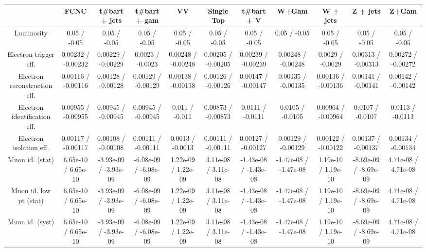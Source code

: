 \begin{table}[htbp]
\begin{center}
\footnotesize
\begin{tabular}{|c|c|c|c|c|c|c|c|c|c|c|}
\hline 
      & FCNC      & t#bar{t} + jets      & t#bar{t} +  gam      & VV      & Single Top      & t#bar{t} + V      & W+Gam      & W + jets      & Z + jets      & Z+Gam \\ 
\hline 
  Luminosity & 0.05 / -0.05 & 0.05 / -0.05 & 0.05 / -0.05 & 0.05 / -0.05 & 0.05 / -0.05 & 0.05 / -0.05 & 0.05 / -0.05 & 0.05 / -0.05 & 0.05 / -0.05 & 0.05 / -0.05 \\ 
  Electron trigger eff. & 0.00232 / -0.00232 & 0.00229 / -0.00229 & 0.0023 / -0.0023 & 0.00248 / -0.00248 & 0.00205 / -0.00205 & 0.00239 / -0.00239 & 0.00248 / -0.00248 & 0.0029 / -0.0029 & 0.00313 / -0.00313 & 0.00272 / -0.00272 \\ 
  Electron reconstruction eff. & 0.00116 / -0.00116 & 0.00128 / -0.00128 & 0.00129 / -0.00129 & 0.00138 / -0.00138 & 0.00126 / -0.00126 & 0.00147 / -0.00147 & 0.00135 / -0.00135 & 0.00136 / -0.00136 & 0.00141 / -0.00141 & 0.00142 / -0.00142 \\ 
  Electron identification eff. & 0.00955 / -0.00955 & 0.00945 / -0.00945 & 0.00945 / -0.00945 & 0.011 / -0.011 & 0.00873 / -0.00873 & 0.0111 / -0.0111 & 0.0105 / -0.0105 & 0.00964 / -0.00964 & 0.0107 / -0.0107 & 0.0113 / -0.0113 \\ 
  Electron isolation eff. & 0.00117 / -0.00117 & 0.00108 / -0.00108 & 0.00111 / -0.00111 & 0.0013 / -0.0013 & 0.00111 / -0.00111 & 0.00127 / -0.00127 & 0.00129 / -0.00129 & 0.00122 / -0.00122 & 0.00137 / -0.00137 & 0.00134 / -0.00134 \\ 
  Muon id. (stat) & 6.65e-10 / 6.65e-10 & -3.93e-09 / -3.93e-09 & -6.08e-09 / -6.08e-09 & 1.22e-09 / 1.22e-09 & 3.11e-08 / 3.11e-08 & -1.43e-08 / -1.43e-08 & -1.47e-08 / -1.47e-08 & 1.19e-10 / 1.19e-10 & -8.69e-09 / -8.69e-09 & 4.71e-08 / 4.71e-08 \\ 
  Muon id. low pt (stat) & 6.65e-10 / 6.65e-10 & -3.93e-09 / -3.93e-09 & -6.08e-09 / -6.08e-09 & 1.22e-09 / 1.22e-09 & 3.11e-08 / 3.11e-08 & -1.43e-08 / -1.43e-08 & -1.47e-08 / -1.47e-08 & 1.19e-10 / 1.19e-10 & -8.69e-09 / -8.69e-09 & 4.71e-08 / 4.71e-08 \\ 
  Muon id. (syst) & 6.65e-10 / 6.65e-10 & -3.93e-09 / -3.93e-09 & -6.08e-09 / -6.08e-09 & 1.22e-09 / 1.22e-09 & 3.11e-08 / 3.11e-08 & -1.43e-08 / -1.43e-08 & -1.47e-08 / -1.47e-08 & 1.19e-10 / 1.19e-10 & -8.69e-09 / -8.69e-09 & 4.71e-08 / 4.71e-08 \\ 

\end{tabular}
\end{center}
\end{table}
